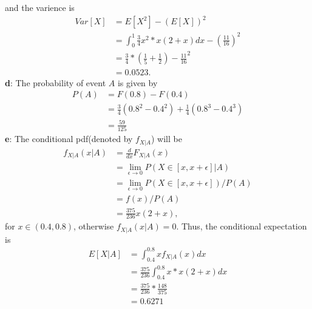 \documentclass[12pt,letterpaper]{article}
\begin{document}
    and the varience is
        \begin{equation*}
            \begin{aligned}
                Var[X] &= E[X^{2}] - (E[X])^{2} \\
                &= \int_{0}^{1} \frac{3}{4} x^{2} * x(2+x)dx - (\frac{11}{16})^{2} \\
                &= \frac{3}{4} * (\frac{1}{5} + \frac{1}{2}) - \frac{11}{16}^{2} \\
                &= 0.0523.
            \end{aligned}
        \end{equation*}
    \textbf{d}: The probability of event $A$ is given by
        \begin{equation*}
            \begin{aligned}
                P(A) &= F(0.8) - F(0.4) \\
                &= \frac{3}{4}(0.8^{2} - 0.4^{2}) + \frac{1}{4}(0.8^{3} - 0.4^{3}) \\
                &= \frac{59}{125}
            \end{aligned}
        \end{equation*}
    \textbf{e}: The conditional pdf(denoted by $f_{X | A}$) will be
        \begin{equation*}
            \begin{aligned}
                f_{X | A}(x | A) &= \frac{d}{dx}F_{X | A}(x) \\
                &= \lim_{\epsilon \to 0} P(X \in [x, x + \epsilon] | A) \\
                &= \lim_{\epsilon \to 0} P(X \in [x, x + \epsilon]) / P(A) \\
                &= f(x) / P(A) \\
                &= \frac{375}{236} x(2 + x),
            \end{aligned}
        \end{equation*}
    for $x \in (0.4, 0.8)$, otherwise $f_{X | A}(x | A) = 0$. Thus, the conditional expectation is
        \begin{equation*}
            \begin{aligned}
                E[X | A] &= \int_{0.4}^{0.8} x f_{X | A}(x) dx \\
                &= \frac{375}{236}  \int_{0.4}^{0.8} x * x(2+x)dx \\
                &= \frac{375}{236} * \frac{148}{375} \\
                &= 0.6271
            \end{aligned}
        \end{equation*}
\end{document}
